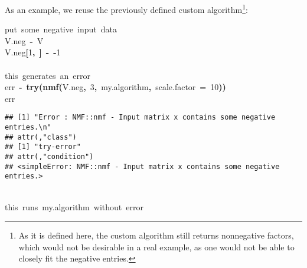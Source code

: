 \documentclass[a4paper]{article}\usepackage{graphicx, color}
\makeatletter
\newcommand{\hlnumber}[1]{\textcolor[rgb]{0,0,0}{#1}}%
\newcommand{\hlfunctioncall}[1]{\textcolor[rgb]{0.501960784313725,0,0.329411764705882}{\textbf{#1}}}%
\newcommand{\hlkeyword}[1]{\textcolor[rgb]{0,0,0}{\textbf{#1}}}%
\newcommand{\hlargument}[1]{\textcolor[rgb]{0.690196078431373,0.250980392156863,0.0196078431372549}{#1}}%
\newcommand{\hlcomment}[1]{\textcolor[rgb]{0.180392156862745,0.6,0.341176470588235}{#1}}%
\newcommand{\hlassignement}[1]{\textcolor[rgb]{0,0,0}{\textbf{#1}}}%
\newcommand{\hlsymbol}[1]{\textcolor[rgb]{0,0,0}{#1}}%
\newcommand{\hlstd}[1]{\textcolor[rgb]{0,0,0}{#1}}%
\newenvironment{kframe}{%
 \def\FrameCommand##1{\hskip\@totalleftmargin \hskip-\fboxsep
 \colorbox{shadecolor}{##1}\hskip-\fboxsep
     \hskip-\linewidth \hskip-\@totalleftmargin \hskip\columnwidth}%
 \MakeFramed {\advance\hsize-\width
   \@totalleftmargin\z@ \linewidth\hsize
   \@setminipage}}%
 {\par\unskip\endMakeFramed}
\newenvironment{knitrout}{}{} %
\makeatother
\begin{document}
As an example, we reuse the previously defined custom algorithm\footnote{As it is defined here, the custom algorithm still returns nonnegative factors, which would not be desirable in a real example, as one would not be able to closely fit the negative entries.}:

\begin{knitrout}
\color{fgcolor}\begin{kframe}
\begin{flushleft}
\ttfamily\noindent
\hlcomment{\usebox{\hlnormalsizeboxhash}{\ }put{\ }some{\ }negative{\ }input{\ }data}\hspace*{\fill}\\
\hlstd{}\hlsymbol{V.neg}{\ }\hlassignement{\usebox{\hlnormalsizeboxlessthan}-}{\ }\hlsymbol{V}\hspace*{\fill}\\
\hlstd{}\hlsymbol{V.neg}\hlkeyword{[}\hlnumber{1}\hlkeyword{,}{\ }\hlkeyword{]}{\ }\hlassignement{\usebox{\hlnormalsizeboxlessthan}-}{\ }\hlkeyword{-}\hlnumber{1}\hspace*{\fill}\\
\hlstd{}\hspace*{\fill}\\
\hlstd{}\hlcomment{\usebox{\hlnormalsizeboxhash}{\ }this{\ }generates{\ }an{\ }error}\hspace*{\fill}\\
\hlstd{}\hlsymbol{err}{\ }\hlassignement{\usebox{\hlnormalsizeboxlessthan}-}{\ }\hlfunctioncall{try}\hlkeyword{(}\hlfunctioncall{nmf}\hlkeyword{(}\hlsymbol{V.neg}\hlkeyword{,}{\ }\hlnumber{3}\hlkeyword{,}{\ }\hlsymbol{my.algorithm}\hlkeyword{,}{\ }\hlargument{scale.factor}{\ }\hlargument{=}{\ }\hlnumber{10}\hlkeyword{)}\hlkeyword{)}\hspace*{\fill}\\
\hlstd{}\hlsymbol{err}\mbox{}
\normalfont
\end{flushleft}
\begin{verbatim}
## [1] "Error : NMF::nmf - Input matrix x contains some negative entries.\n"
## attr(,"class")
## [1] "try-error"
## attr(,"condition")
## <simpleError: NMF::nmf - Input matrix x contains some negative entries.>
\end{verbatim}
\begin{flushleft}
\ttfamily\noindent
\hspace*{\fill}\\
\hlstd{}\hlcomment{\usebox{\hlnormalsizeboxhash}{\ }this{\ }runs{\ }my.algorithm{\ }without{\ }error}\hspace*{\fill}\\

\end{flushleft}
\end{kframe}
\end{knitrout}
\end{document}
